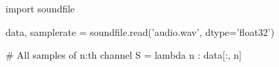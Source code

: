 import soundfile

data, samplerate = soundfile.read('audio.wav', dtype='float32')

# All samples of n:th channel
S = lambda n : data[:, n]